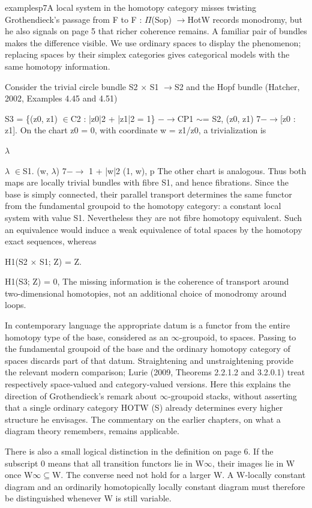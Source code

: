 \begin{dcomment}{examples}{p7}{A local system in the homotopy category misses twisting}
Grothendieck’s passage from F to F\textasciimacron{} : \ensuremath{\Pi}(Sop) \ensuremath{\to}HotW records monodromy, but he also signals on page 5 that richer coherence remains. A familiar pair of bundles makes the difference visible. We use ordinary spaces to display the phenomenon; replacing spaces by their simplex categories gives categorical models with the same homotopy information.

Consider the trivial circle bundle S2 \ensuremath{\times} S1 \ensuremath{\to}S2 and the Hopf bundle (Hatcher, 2002, Examples 4.45 and 4.51)

S3 = \{(z0, z1) \ensuremath{\in}C2 : |z0|2 + |z1|2 = 1\} \ensuremath{-}\ensuremath{\to}CP1 \ensuremath{\sim}= S2, (z0, z1) 7\ensuremath{-}\ensuremath{\to}[z0 : z1]. On the chart z0 = 0, with coordinate w = z1/z0, a trivialization is

\ensuremath{\lambda}

\ensuremath{\lambda} \ensuremath{\in}S1. (w, \ensuremath{\lambda}) 7\ensuremath{-}\ensuremath{\to} 1 + |w|2 (1, w), p The other chart is analogous. Thus both maps are locally trivial bundles with fibre S1, and hence fibrations. Since the base is simply connected, their parallel transport determines the same functor from the fundamental groupoid to the homotopy category: a constant local system with value S1. Nevertheless they are not fibre homotopy equivalent. Such an equivalence would induce a weak equivalence of total spaces by the homotopy exact sequences, whereas

H1(S2 \ensuremath{\times} S1; Z) = Z.

H1(S3; Z) = 0, The missing information is the coherence of transport around two-dimensional homotopies, not an additional choice of monodromy around loops.

In contemporary language the appropriate datum is a functor from the entire homotopy type of the base, considered as an \ensuremath{\infty}-groupoid, to spaces. Passing to the fundamental groupoid of the base and the ordinary homotopy category of spaces discards part of that datum. Straightening and unstraightening provide the relevant modern comparison; Lurie (2009, Theorems 2.2.1.2 and 3.2.0.1) treat respectively space-valued and category-valued versions. Here this explains the direction of Grothendieck’s remark about \ensuremath{\infty}-groupoid stacks, without asserting that a single ordinary category HOTW (S) already determines every higher structure he envisages. The commentary on the earlier chapters, on what a diagram theory remembers, remains applicable.

There is also a small logical distinction in the definition on page 6. If the subscript 0 means that all transition functors lie in W\ensuremath{\infty}, their images lie in W once W\ensuremath{\infty}\ensuremath{\subseteq}W. The converse need not hold for a larger W. A W-locally constant diagram and an ordinarily homotopically locally constant diagram must therefore be distinguished whenever W is still variable.

\end{dcomment}

